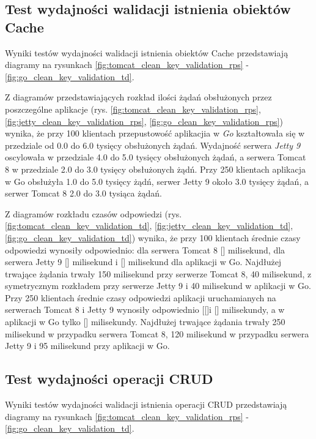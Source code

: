 \subsection{Test wydajności walidacji istnienia obiektów Cache}
Wyniki testów wydajności walidacji istnienia obiektów Cache przedstawiają diagramy na rysunkach \ref{fig:tomcat_clean_key_validation_rps} - \ref{fig:go_clean_key_validation_td}.              

Z diagramów przedstawiających rozkład ilości żądań obsłużonych przez poszczególne aplikacje  (rys. \ref{fig:tomcat_clean_key_validation_rps}, \ref{fig:jetty_clean_key_validation_rps}, \ref{fig:go_clean_key_validation_rps}) wynika, że przy 100 klientach przepustowość aplikacjia w \textsl{Go} kształtowała się w przedziale od 0.0 do 6.0 tysięcy obsłużonych żądań. Wydajność serwera \textsl{Jetty 9} oscylowała w przedziale 4.0 do 5.0 tysięcy obsłużonych żądań, a  serwera Tomcat 8 w przedziale 2.0 do 3.0 tysięcy obsłużonych żądń.  Przy 250 klientach  aplikacja w Go obsłużyła 1.0 do 5.0 tysięcy żądń, serwer Jetty 9 około 3.0 tysięcy żądań, a serwer Tomcat 8  2.0 do 3.0 tysiąca żądań.

Z diagramów rozkładu czasów odpowiedzi (rys. \ref{fig:tomcat_clean_key_validation_td}, \ref{fig:jetty_clean_key_validation_td}, \ref{fig:go_clean_key_validation_td}) wynika, że przy 100 klientach średnie czasy odpowiedzi wynosiły odpowiednio: dla serwera Tomcat 8 [] milisekund, dla serwera Jetty 9 [] milisekund i [] milisekund dla aplikacji w Go.  Najdłużej trwające żądania trwały 150 milisekund przy serwerze Tomcat 8, 40 milisekund, z symetrycznym rozkładem przy serwerze  Jetty 9 i 40 milisekund  w aplikacji w Go. Przy 250 klientach średnie czasy odpowiedzi aplikacji uruchamianych na serwerach Tomcat 8 i Jetty 9  wynosiły odpowiednio [[]i [] milisekundy, a w aplikacji w Go tylko [] milisekundy. Najdłużej trwające żądania trwały 250 milisekund w przypadku serwera Tomcat 8, 120 milisekund w przypadku serwera Jetty 9 i 95 milisekund przy aplikacji w Go. 


\clearpage

\subsection{Test wydajności operacji CRUD}

Wyniki testów wydajności walidacji istnienia operacji CRUD przedstawiają diagramy na rysunkach \ref{fig:tomcat_clean_key_validation_rps} - \ref{fig:go_clean_key_validation_td}.              

